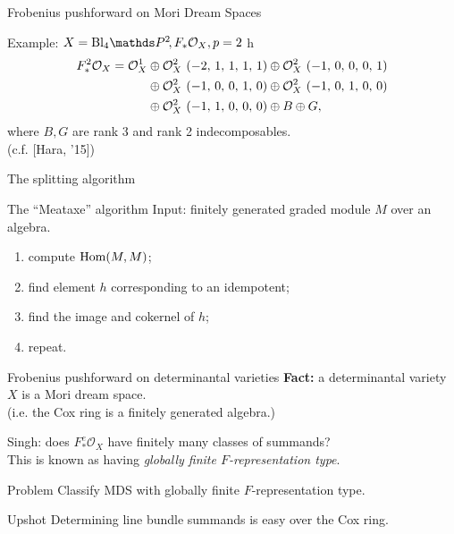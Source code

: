 \documentclass[beamer]{paper}
\def\OO{\mathcal{O}}
\begin{document}
\begin{frame}{Frobenius pushforward on Mori Dream Spaces}
  \begin{block}{Example: $X = \mathrm{Bl}_4\PP2, F_*\o_X, p = 2$}
    \vspace*{-0.15in}
    h\begin{align*}
      F_*^2\o_X = {\o_{X}^{1}}
      &\oplus {\o_{X}^{2}\ \left(-2,\,1,\,1,\,1,\,1\right)} \oplus {\o_{X}^{2}\ \left(-1,\,0,\,0,\,0,\,1\right)} \\ 
      &\oplus {\o_{X}^{2}\ \left(-1,\,0,\,0,\,1,\,0\right)} \oplus {\o_{X}^{2}\ \left(-1,\,0,\,1,\,0,\,0\right)} \\
      &\oplus {\o_{X}^{2}\ \left(-1,\,1,\,0,\,0,\,0\right)} \oplus B \oplus G,
    \end{align*}
    where $B, G$ are rank 3 and rank 2 indecomposables. \\
    \hfill (c.f. [Hara, '15])
  \end{block}
\end{frame}


\begin{frame}{The splitting algorithm}
  \begin{alertblock}{The ``Meataxe'' algorithm}
    Input: finitely generated graded module $M$ over an algebra.
    \begin{enumerate}
    \item compute $\operatorname{Hom}(M, M)$; %
    \item find element $h$ corresponding to an idempotent; %
    \item find the image and cokernel of $h$; %
    \item repeat.
    \end{enumerate}
  \end{alertblock}
\end{frame}


\begin{frame}[t]{Frobenius pushforward on determinantal varieties}
  \textbf{Fact:} a determinantal variety $X$ is a Mori dream space. \\
  \hfill (i.e. the Cox ring is a finitely generated algebra.)

  \vfill
  Singh: does $F^e_*\OO_X$ have finitely many classes of summands? \\
  This is known as having \emph{globally finite $F$-representation type}.

  \begin{block}{Problem}
    Classify MDS with globally finite $F$-representation type.
  \end{block}

  \begin{alertblock}{Upshot}
    Determining line bundle summands is easy over the Cox ring.
  \end{alertblock}

  \vfill
\end{frame}
\end{document}
